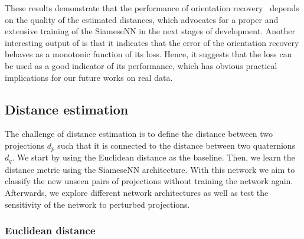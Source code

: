 These results demonstrate that the performance of orientation recovery~ depends on the quality of the estimated distances, which advocates for a proper and extensive training of the SiameseNN in the next stages of development.
Another interesting output of  is that it indicates that the error of the orientation recovery behaves as a monotonic function of its loss.
Hence, it suggests that the loss can be used as a good indicator of its performance, which has obvious practical implications for our future works on real data.

\subsection{Distance estimation}\label{sec:results:distance-estimation}


The challenge of distance estimation is to define the distance between two projections $d_p$ such that it is connected to the distance between two quaternions $d_q$. We start by using the Euclidean distance as the baseline. Then, we learn the distance metric using the SiameseNN architecture. With this network we aim to classify the new unseen pairs of projections without training the network again. Afterwards, we explore different network architectures as well as test the sensitivity of the network to perturbed projections.

\subsubsection{Euclidean distance}\label{sec:results:distance-estimation:euclidean}



